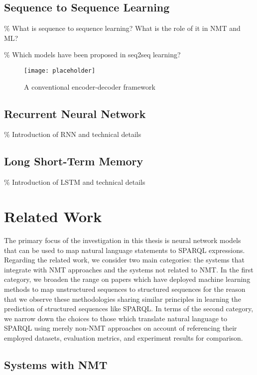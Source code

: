 \subsection{Sequence to Sequence Learning}
\% What is sequence to sequence learning? What is the role of it in NMT and ML?

\% Which models have been proposed in seq2seq learning?

\begin{figure}[h]
\texttt{[image: placeholder]}
\centering
\caption{A conventional encoder-decoder framework}
\label{figure:encoder-decoder}
\end{figure}

\subsection{Recurrent Neural Network} \label{subsection:rnn}
\% Introduction of RNN and technical details

\subsection{Long Short-Term Memory}
\% Introduction of LSTM and technical details

\section{Related Work} \label{section:related work}

The primary focus of the investigation in this thesis is neural network models that can be used to map natural language statements to SPARQL expressions. Regarding the related work, we consider two main categories: the systems that integrate with NMT approaches and the systems not related to NMT. In the first category, we broaden the range on papers which have deployed machine learning methods to map unstructured sequences to structured sequences for the reason that we observe these methodologies sharing similar principles in learning the prediction of structured sequences like SPARQL. In terms of the second category, we narrow down the choices to those which translate natural language to SPARQL using merely non-NMT approaches on account of referencing their employed datasets, evaluation metrics, and experiment results for comparison. 

\subsection{Systems with NMT} \label{subsection:related work with nmt}

